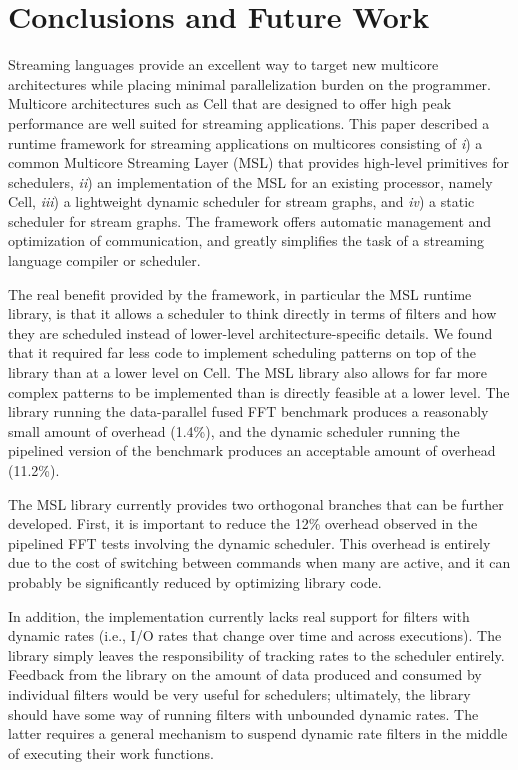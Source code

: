 \section{Conclusions and Future Work}\label{ch:conc}

Streaming languages provide an excellent way to
target new multicore architectures while placing minimal
parallelization burden on the programmer. Multicore architectures such
as Cell that are designed to offer high peak performance are well
suited for streaming applications. This paper described a runtime
framework for streaming applications on multicores consisting of
\emph{i}) a common Multicore Streaming Layer (MSL) that provides
high-level primitives for schedulers, \emph{ii}) an implementation
of the MSL for an existing processor, namely Cell, \emph{iii}) a
lightweight dynamic scheduler for stream graphs, and \emph{iv}) a
static scheduler for stream graphs. The framework offers automatic
management and optimization of communication, and greatly
simplifies the task of a streaming language compiler or scheduler.

The real benefit provided by the framework, in particular the MSL
runtime library, is that it allows a scheduler to think directly in
terms of filters and how they are scheduled instead of lower-level
architecture-specific details. We found that it required
far less code to implement scheduling patterns on top of the library
than at a lower level on Cell. The MSL library also
allows for far more complex patterns to be implemented than is
directly feasible at a lower level. The library running the
data-parallel fused FFT benchmark produces a reasonably small amount
of overhead (1.4\%), and the dynamic scheduler running the pipelined
version of the benchmark produces an acceptable amount of overhead
(11.2\%).

The MSL library currently provides two orthogonal branches that can be
further developed. First, it is important to reduce the 12\% overhead
observed in the pipelined FFT tests involving the dynamic
scheduler. This overhead is entirely due to the cost of switching
between commands when many are active, and it can probably be significantly
reduced by optimizing library code.

In addition, the implementation currently lacks real support for
filters with dynamic rates (i.e., I/O rates that change over time and
across executions). The library simply leaves the responsibility of
tracking rates to the scheduler entirely. Feedback from the library on
the amount of data produced and consumed by individual filters
would be very useful for schedulers; ultimately, the library should
have some way of running filters with unbounded dynamic rates. The
latter requires a general mechanism to suspend dynamic rate filters in
the middle of executing their work functions.

